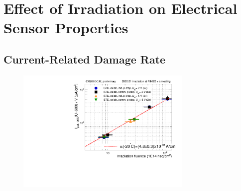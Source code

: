 \section{Effect of Irradiation on Electrical Sensor Properties}
\label{sec:irradiation}

\subsection{Current-Related Damage Rate}
\label{subsec:irradiation_alpha}

\begin{figure}[h]
	\centering
	\includegraphics[width=0.75\textwidth]{plots/alpha/alpha_600V.pdf}
	\label{plot:alpha}

\end{figure}

